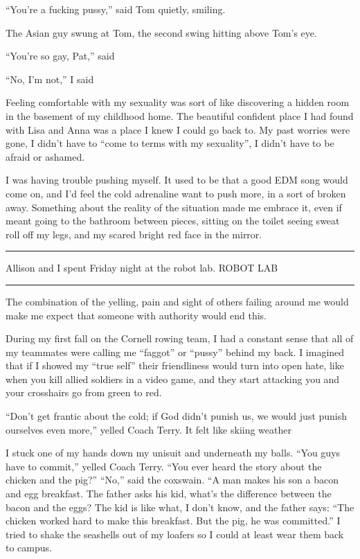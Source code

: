 ``You're a fucking pussy,'' said Tom quietly, smiling. 

The Asian guy swung at Tom, the second swing hitting above Tom's eye.

``You're so gay, Pat,'' said 

``No, I'm not,'' I said

Feeling comfortable with my sexuality was sort of like discovering a hidden room
in the basement of my childhood home.  The beautiful confident place I had found
with Lisa and Anna was a place I knew I could go back to.  My past worries were
gone, I didn't have to ``come to terms with my sexuality'', I didn't have to be
afraid or ashamed. 

I was having trouble pushing myself.  It used to be that a good EDM song would
come on, and I'd feel the cold adrenaline want to push more, in a sort of broken
away.  Something about the reality of the situation made me embrace it, even if
meant going to the bathroom between pieces, sitting on the toilet seeing sweat
roll off my legs, and my scared bright red face in the mirror.  

\plainfancybreak{12pt}{2}{* * *}

Allison and I spent Friday night at the robot lab.
ROBOT LAB

\plainfancybreak{12pt}{2}{* * *}

The combination of the yelling, pain and sight of others failing around me would
make me expect that someone with authority would end this.

During my first fall on the Cornell rowing team, I had a constant sense that
all of my teammates were calling me ``faggot'' or ``pussy'' behind my back.  I
imagined that if I showed my ``true self'' their friendliness would turn into
open hate, like when you kill allied soldiers in a video game, and they start
attacking you and your crosshairs go from green to red.  

``Don't get frantic about the cold; if God didn't punish us, we would just
punish ourselves even more,'' yelled Coach Terry.  It felt like skiing weather

I stuck one of my hands down my unisuit and underneath my balls.  ``You guys
have to commit,'' yelled Coach Terry.  ``You ever heard the story about the
chicken and the pig?'' ``No,'' said the coxswain.  ``A man makes his son a bacon
and egg breakfast.  The father asks his kid, what's the difference between the
bacon and the eggs?  The kid is like what, I don't know, and the father says:
``The chicken worked hard to make this breakfast.  But the pig, he was
committed.'' I tried to shake the seashells out of my loafers so I could at
least wear them back to campus. 

